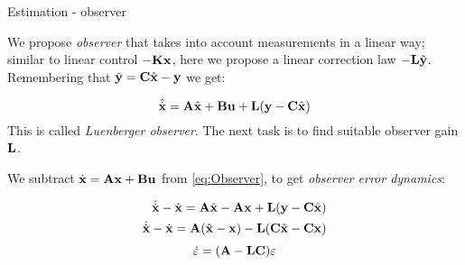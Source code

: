 \documentclass{beamer}
\begin{document}
\begin{frame}{Estimation - observer}
\begin{flushleft}

We propose \emph{observer} that takes into account measurements in a linear way; similar to linear control $-\mathbf{K}\mathbf{x}$, here we propose a linear correction law $-\mathbf{L}\Tilde{\mathbf{y}}$. Remembering that $\Tilde{\mathbf{y}} = \mathbf{C} \hat{\mathbf{x}} - \mathbf{y}$ we get:

\begin{equation}
\label{eq:Observer}
\hat{\dot {\mathbf{x}}} = \mathbf{A} \hat{\mathbf{x}} + \mathbf{B} \mathbf{u} + \mathbf{L}(\mathbf{y} - \mathbf{C} \hat{\mathbf{x}})
\end{equation}
%
This is called \emph{Luenberger observer}. The next task is to find suitable observer gain $ \mathbf{L}$.

\bigskip

We subtract $\dot {\mathbf{x}} = \mathbf{A} \mathbf{x} + \mathbf{B} \mathbf{u}$ from \eqref{eq:Observer}, to get \emph{observer error dynamics}:

\begin{align}
\hat{\dot {\mathbf{x}}} - \dot {\mathbf{x}}= 
\mathbf{A} \hat{\mathbf{x}} - \mathbf{A} \mathbf{x} + 
\mathbf{L}(\mathbf y - \mathbf{C} \hat{\mathbf{x}})
\\
\hat{\dot {\mathbf{x}}} - \dot {\mathbf{x}}
= 
\mathbf{A} (\hat{\mathbf{x}} -  \mathbf{x} ) - 
\mathbf{L}(\mathbf{C} \hat{\mathbf{x}} -  \mathbf{C} \mathbf{x} ) 
\end{align}
%
\begin{equation}
\dot {\varepsilon}= 
(\mathbf{A} - \mathbf{L} \mathbf{C}) \varepsilon
\end{equation}

\end{flushleft}
\end{frame}
\end{document}
